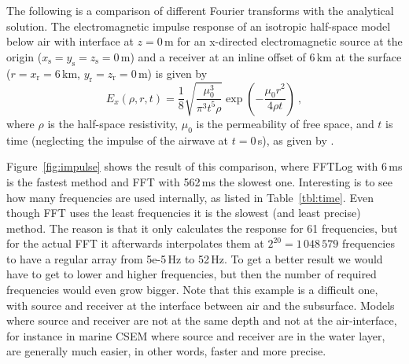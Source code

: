 \documentclass[manuscript,revised]{geophysics}
\begin{document}
The following is a comparison of different Fourier transforms with the
analytical solution. The electromagnetic impulse response of an isotropic
half-space model below air with interface at $z=0\,$m for an x-directed
electromagnetic source at the origin
($x_\textrm{s}=y_\textrm{s}=z_\textrm{s}=0\,$m) and a receiver at an inline
offset of 6\,km at the surface ($r = x_\textrm{r}=6\,$km,
$y_\textrm{r}=z_\textrm{r}=0\,$m) is given by
%
\begin{equation}
  E_x(\rho,r,t) = \frac{1}{8} \sqrt{\frac{\mu_0^3}{\pi^3 t^5 \rho}}
                    \exp\left(-\frac{\mu_0 r^2}{4\rho t}\right)\ ,
  \label{eq:impulse}
\end{equation}
%
where $\rho$ is the half-space resistivity, $\mu_0$ is the permeability of free
space, and $t$ is time (neglecting the impulse of the airwave at $t=0\,$s), as
given by \citet[][ eq. 5.38]{PhD.97.Wilson}.

Figure~\ref{fig:impulse} shows the result of this comparison, where FFTLog with
6\,ms is the fastest method and FFT with 562\,ms the slowest one. Interesting
is to see how many frequencies are used internally, as listed in
Table~\ref{tbl:time}.
%
%
%
Even though FFT uses the least frequencies it is the slowest (and least
precise) method. The reason is that it only calculates the response for 61
frequencies, but for the actual FFT it afterwards interpolates them at $2^{20}
= 1\,048\,579$ frequencies to have a regular array from 5e-5\,Hz to 52\,Hz. To
get a better result we would have to get to lower and higher frequencies, but
then the number of required frequencies would even grow bigger. Note that this
example is a difficult one, with source and receiver at the interface between
air and the subsurface. Models where source and receiver are not at the same
depth and not at the air-interface, for instance in marine CSEM where source
and receiver are in the water layer, are generally much easier, in other words,
faster and more precise.
%
%
\end{document}
